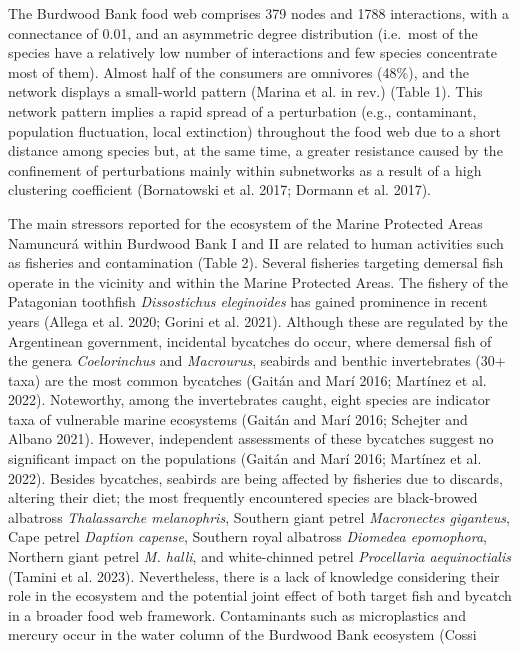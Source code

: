\documentclass[
]{article}
\begin{document}
The Burdwood Bank food web comprises 379 nodes and 1788 interactions,
with a connectance of 0.01, and an asymmetric degree distribution
(i.e.~most of the species have a relatively low number of interactions
and few species concentrate most of them). Almost half of the consumers
are omnivores (48\%), and the network displays a small-world pattern
(Marina et al. in rev.) (Table 1). This network pattern implies a rapid
spread of a perturbation (e.g., contaminant, population fluctuation,
local extinction) throughout the food web due to a short distance among
species but, at the same time, a greater resistance caused by the
confinement of perturbations mainly within subnetworks as a result of a
high clustering coefficient (Bornatowski et al. 2017; Dormann et al.
2017).

The main stressors reported for the ecosystem of the Marine Protected
Areas Namuncurá within Burdwood Bank I and II are related to human
activities such as fisheries and contamination (Table 2). Several
fisheries targeting demersal fish operate in the vicinity and within the
Marine Protected Areas. The fishery of the Patagonian toothfish
\emph{Dissostichus eleginoides} has gained prominence in recent years
(Allega et al. 2020; Gorini et al. 2021). Although these are regulated
by the Argentinean government, incidental bycatches do occur, where
demersal fish of the genera \emph{Coelorinchus} and \emph{Macrourus},
seabirds and benthic invertebrates (30+ taxa) are the most common
bycatches (Gaitán and Marí 2016; Martínez et al. 2022). Noteworthy,
among the invertebrates caught, eight species are indicator taxa of
vulnerable marine ecosystems (Gaitán and Marí 2016; Schejter and Albano
2021). However, independent assessments of these bycatches suggest no
significant impact on the populations (Gaitán and Marí 2016; Martínez et
al. 2022). Besides bycatches, seabirds are being affected by fisheries
due to discards, altering their diet; the most frequently encountered
species are black-browed albatross \emph{Thalassarche melanophris},
Southern giant petrel \emph{Macronectes giganteus}, Cape petrel
\emph{Daption capense}, Southern royal albatross \emph{Diomedea
epomophora}, Northern giant petrel \emph{M. halli}, and white-chinned
petrel \emph{Procellaria aequinoctialis} (Tamini et al. 2023).
Nevertheless, there is a lack of knowledge considering their role in the
ecosystem and the potential joint effect of both target fish and bycatch
in a broader food web framework. Contaminants such as microplastics and
mercury occur in the water column of the Burdwood Bank ecosystem (Cossi
\end{document}
